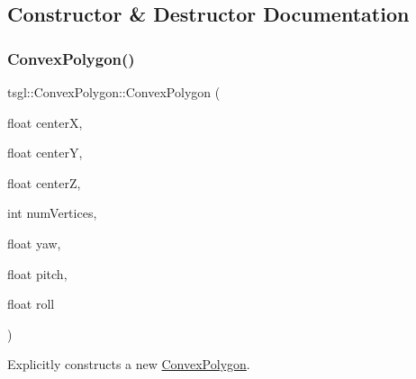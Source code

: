 \subsection{Constructor \& Destructor Documentation}
\mbox{\label{classtsgl_1_1_convex_polygon_a24507f367aec93ffba00f1c50167362f}} 
\subsubsection{\texorpdfstring{Convex\+Polygon()}{ConvexPolygon()}\hspace{0.1cm}{\footnotesize\ttfamily [1/3]}}
{\footnotesize\ttfamily tsgl\+::\+Convex\+Polygon\+::\+Convex\+Polygon (\begin{DoxyParamCaption}\item[{float}]{centerX,  }\item[{float}]{centerY,  }\item[{float}]{centerZ,  }\item[{int}]{num\+Vertices,  }\item[{float}]{yaw,  }\item[{float}]{pitch,  }\item[{float}]{roll }\end{DoxyParamCaption})\hspace{0.3cm}{\ttfamily [protected]}}



Explicitly constructs a new \hyperlink{classtsgl_1_1_convex_polygon}{Convex\+Polygon}. 

